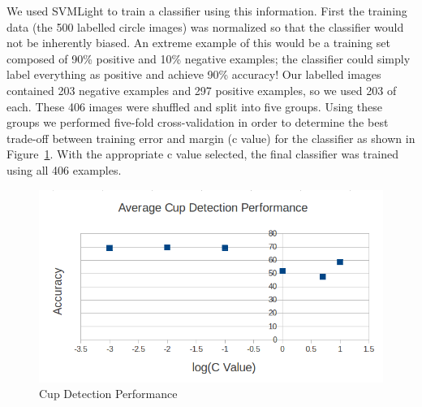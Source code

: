 \documentclass[letterpaper, 10 pt, conference]{ieeeconf}  %
\begin{document}
We used SVMLight to train a classifier using this information.  First the training data (the 500 labelled circle images) was normalized so that the classifier would not be inherently biased.  An extreme example of this would be a training set composed of 90\% positive and 10\% negative examples; the classifier could simply label everything as positive and achieve 90\% accuracy!  Our labelled images contained 203 negative examples and 297 positive examples, so we used 203 of each.  These 406 images were shuffled and split into five groups.  Using these groups we performed five-fold cross-validation in order to determine the best trade-off between training error and margin (c value) for the classifier as shown in Figure~\ref{fig:cvalue}.  With the appropriate c value selected, the final classifier was trained using all 406 examples.
\begin{figure}[thpb]
      \centering
	  \includegraphics[scale =0.3]{avgperform}
      \caption{Cup Detection Performance}
      \label{fig:cvalue}
\end{figure}
\end{document}
